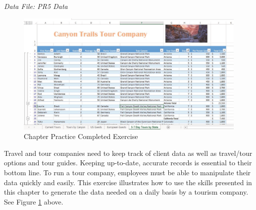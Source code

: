 \textit{Data File: PR5 Data}

\begin{figure}[H]
	\centering
	\includegraphics[width=\maxwidth{.95\linewidth}]{gfx/ch05_fig30}
	\caption{Chapter Practice Completed Exercise}
	\label{05:fig30}
\end{figure}

Travel and tour companies need to keep track of client data as well as travel/tour options and tour guides. Keeping up-to-date, accurate records is essential to their bottom line. To run a tour company, employees must be able to manipulate their data quickly and easily. This exercise illustrates how to use the skills presented in this chapter to generate the data needed on a daily basis by a tourism company. See Figure \ref{05:fig30} above.


